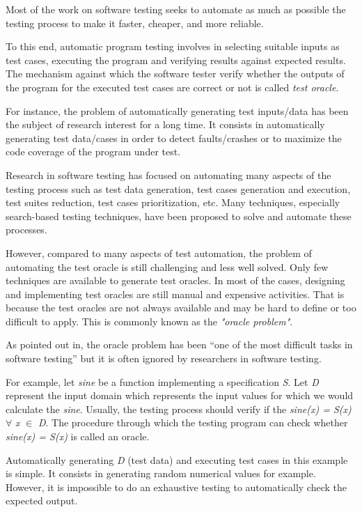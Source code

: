 Most of the work on software testing seeks to automate as much as possible the testing process to make it faster, cheaper, and more reliable. 

To this end, automatic program testing involves in selecting suitable inputs as test cases, executing the program and verifying results against expected results. 
The mechanism against which the software tester verify whether the outputs of the program for the executed test cases are correct or not is called \textit{test oracle}. 

For instance, the problem of automatically generating test inputs/data has been the subject of research interest for a long time. It consists in automatically generating test data/cases in order to detect faults/crashes or to maximize the code coverage of the program under test. 


Research in software testing has focused on automating many aspects of the testing process such as test data generation, test cases generation and execution, test suites reduction, test cases prioritization, etc. Many techniques, especially search-based testing techniques, have been proposed to solve and automate these processes\cite{ali2010systematic}.

However, compared to many aspects of test automation, the problem of automating the test oracle is still challenging and less well solved. Only few techniques are available to generate test oracles. In most of the cases, designing and implementing test oracles are still manual and expensive activities. That is because the test oracles are not always available and may be hard to define or too difficult to apply\cite{barr2015oracle}. This is commonly known as the \textit{"oracle problem"}. 

As pointed out in\cite{manolache2001software}, the oracle problem has been “one of the most difficult tasks in software testing” but it is often ignored by researchers in software testing.

For example, let \textit{sine} be a function implementing a specification \textit{S}. Let \textit{D} represent the input domain which represents the input values for which we would calculate the \textit{sine}. Usually, the testing process should verify if the \textit{sine(x) = S(x)} $\forall$ \textit{x} $\in$ \textit{D}. The procedure through which the testing program can check whether \textit{sine(x) = S(x)} is called an oracle.

Automatically generating  \textit{D} (test data) and executing test cases in this example is simple. It consists in generating random numerical values for example. However, it is impossible to do an exhaustive testing to automatically check the expected output.

